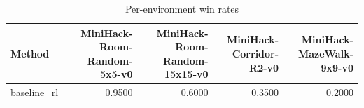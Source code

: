 \begin{table}[htbp]
\centering
\caption{Per-environment win rates}
\label{tab:per-env}
\begin{tabular}{lrrrr}
\toprule
\textbf{Method} & \textbf{MiniHack-Room-Random-5x5-v0} & \textbf{MiniHack-Room-Random-15x15-v0} & \textbf{MiniHack-Corridor-R2-v0} & \textbf{MiniHack-MazeWalk-9x9-v0} \\
\midrule
baseline\_rl & 0.9500 & 0.6000 & 0.3500 & 0.2000 \\
\bottomrule
\end{tabular}
\end{table}